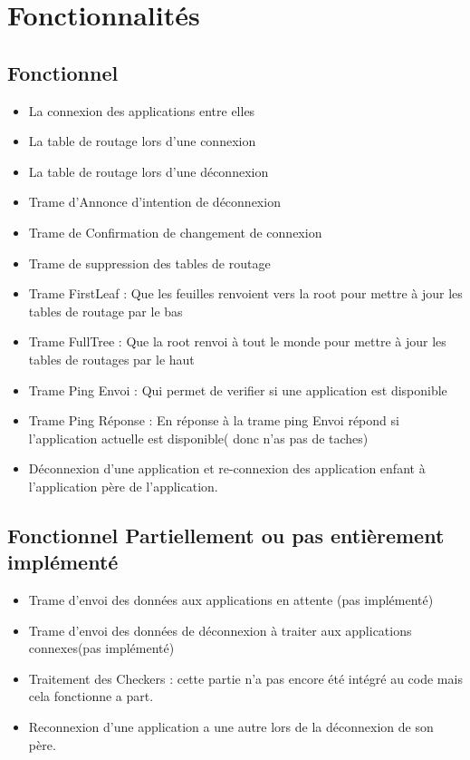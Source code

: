\documentclass[a4paper,titlepage]{report}
\begin{document}
\pagebreak
\section{Fonctionnalités}
\subsection{Fonctionnel}
\begin{itemize}
\item La connexion des applications entre elles
\item La table de routage lors d'une connexion
\item La table de routage lors d'une déconnexion
\item Trame d'Annonce d'intention de déconnexion
\item Trame de Confirmation de changement de connexion
\item Trame de suppression des tables de routage
\item Trame FirstLeaf : Que les feuilles renvoient vers la root pour mettre à jour les tables de routage par le bas
\item Trame FullTree : Que la root renvoi à tout le monde pour mettre à jour les tables de routages par le haut
\item Trame Ping Envoi : Qui permet de verifier si une application est disponible
\item Trame Ping Réponse : En réponse à la trame ping Envoi répond si l'application actuelle est disponible( donc n'as pas de taches)
\item Déconnexion d'une application et re-connexion des application enfant à l'application père de l'application.
\end{itemize}

\subsection{Fonctionnel Partiellement ou pas entièrement implémenté}
\begin{itemize}
\item Trame  d'envoi des données aux applications en attente (pas implémenté)
\item Trame d'envoi des données de déconnexion à traiter aux applications connexes(pas implémenté)
\item Traitement des Checkers : cette partie n'a pas encore été intégré au code mais cela fonctionne a part.
\item Reconnexion d'une application a une autre lors de la déconnexion de son père.
\end{itemize}
\end{document}
